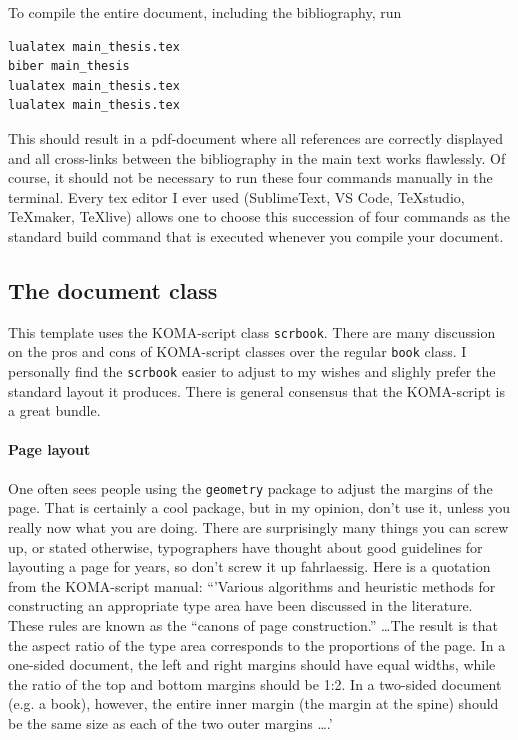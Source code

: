 To compile the entire document, including the bibliography, run
\begin{lstlisting}
lualatex main_thesis.tex
biber main_thesis
lualatex main_thesis.tex
lualatex main_thesis.tex
\end{lstlisting}

This should result in a pdf-document where all references are correctly displayed and all cross-links between the bibliography in the main text works flawlessly.
Of course, it should not be necessary to run these four commands manually in the terminal. Every tex editor I ever used (SublimeText, VS Code, TeXstudio, TeXmaker, TeXlive) allows one to choose 
this succession of four commands as the standard build command that is executed whenever you compile your document.


\subsection{The document class}
This template uses the KOMA-script class \verb|scrbook|. There are many discussion on the pros and cons of KOMA-script classes over the regular \verb|book| class. I personally find the \verb|scrbook| easier to adjust to my wishes and slighly prefer the standard layout it produces. There is general consensus that the KOMA-script is a great bundle.

\paragraph{Page layout} One often sees people using the \verb|geometry| package to adjust the margins of the page. That is certainly a cool package, but in my opinion, don't use it, unless you really now what you are doing. There are surprisingly many things you can screw up, or stated otherwise, typographers have thought about good guidelines for layouting a page for years, so don't screw it up fahrlaessig.  
Here is a quotation from the KOMA-script manual:
``'Various algorithms and heuristic methods for constructing an appropriate type area have been
discussed in the literature. These rules are known as the ``canons of page construction.'' \ldots The result is that the
aspect ratio of the type area corresponds to the proportions of the page. In a one-sided document,
the left and right margins should have equal widths, while the ratio of the top and bottom margins
should be 1:2. In a two-sided document (e.g. a book), however, the entire inner margin (the margin at the spine) should be the same size as each of the two outer margins \ldots.'

